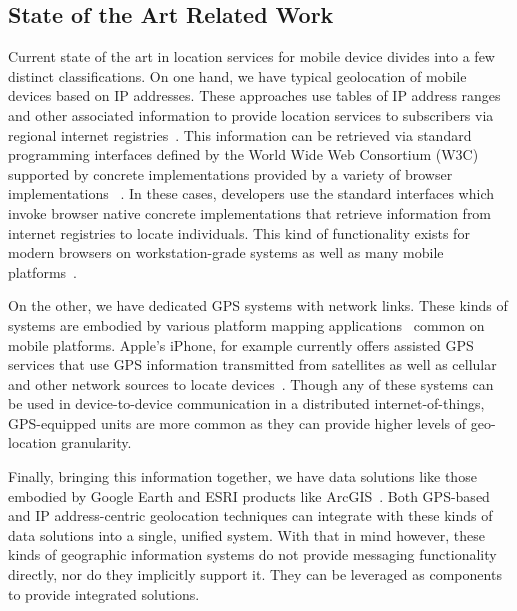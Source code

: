 \documentclass{sbir}
\begin{document}
\subsection{State of the Art Related Work}
Current state of the art in location services for mobile device divides into a few distinct classifications. On one hand, we have typical geolocation of mobile devices based on IP addresses. These approaches use tables of IP address ranges and other associated information to provide location services to subscribers via regional internet registries~\cite{AIRN:13,RIPE:13}. This information can be retrieved via standard programming interfaces defined by the World Wide Web Consortium (W3C)~\cite{w3c:13} supported by concrete implementations provided by a variety of browser implementations ~\cite{firefox:13,Pi:13}. In these cases, developers use the standard interfaces which invoke browser native concrete implementations that retrieve information from internet registries to locate individuals. This kind of functionality exists for modern browsers on workstation-grade systems as well as many mobile platforms~\cite{safari:13,opera:13}.

On the other, we have dedicated GPS systems with network links. These kinds of systems are embodied by various platform mapping applications~\cite{gmap:13,amap:13} common on mobile platforms. Apple's iPhone, for example currently offers assisted GPS services that use GPS information transmitted from satellites as well as cellular and other network sources to locate devices~\cite{amap:13}. Though any of these systems can be used in device-to-device communication in a distributed internet-of-things, GPS-equipped units are more common as they can provide higher levels of geo-location granularity.

Finally, bringing this information together, we have data solutions like those embodied by Google Earth and ESRI products like ArcGIS~\cite{esri:13,gearth:13}. Both GPS-based and IP address-centric geolocation techniques can integrate with these kinds of data solutions into a single, unified system. With that in mind however, these kinds of geographic information systems do not provide messaging functionality directly, nor do they implicitly support it. They can be leveraged as components to provide integrated solutions.
\end{document}
